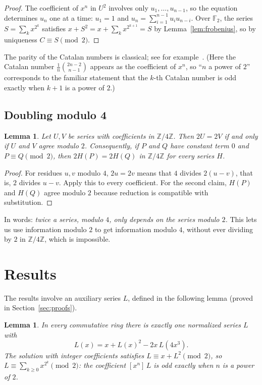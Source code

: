 \documentclass[11pt,a4paper]{article}
\newtheorem{lemma}[theorem]{Lemma}
\theoremstyle{definition}
\theoremstyle{remark}
\newcommand{\Z}{\mathbb{Z}}
\newcommand{\F}{\mathbb{F}}
\newcommand{\coeff}[2]{[x^{#1}]\,#2}
\begin{document}
\begin{proof}
The coefficient of $x^n$ in $U^2$ involves only $u_1,\dots,u_{n-1}$, so the equation determines $u_n$ one at a time:
$u_1=1$ and $u_n=\sum_{i=1}^{n-1}u_iu_{n-i}$. Over $\F_2$, the series $S=\sum_kx^{2^k}$ satisfies
$x+S^2=x+\sum_kx^{2^{k+1}}=S$ by Lemma~\ref{lem:frobenius}, so by uniqueness $C\equiv S\pmod2$.
\end{proof}
The parity of the Catalan numbers is classical; see for example~\cite{deutschsagan}. (Here the Catalan number
$\frac1{n}\binom{2n-2}{n-1}$ appears as the coefficient of $x^n$, so ``$n$ a power of $2$'' corresponds to the familiar
statement that the $k$-th Catalan number is odd exactly when $k+1$ is a power of $2$.)

\subsection{Doubling modulo 4}
\begin{lemma}\label{lem:double}
Let $U,V$ be series with coefficients in $\Z/4\Z$. Then $2U=2V$ if and only if $U$ and $V$ agree modulo $2$.
Consequently, if $P$ and $Q$ have constant term $0$ and $P\equiv Q\pmod 2$, then $2H(P)=2H(Q)$ in $\Z/4\Z$ for every
series $H$.
\end{lemma}

\begin{proof}
For residues $u,v$ modulo $4$, $2u=2v$ means that $4$ divides $2(u-v)$, that is, $2$ divides $u-v$. Apply this to
every coefficient. For the second claim, $H(P)$ and $H(Q)$ agree modulo $2$ because reduction is compatible with
substitution.
\end{proof}
In words: \emph{twice a series, modulo $4$, only depends on the series modulo $2$.} This lets us use information modulo
$2$ to get information modulo $4$, without ever dividing by $2$ in $\Z/4\Z$, which is impossible.


\section{Results}\label{sec:results}

The results involve an auxiliary series $L$, defined in the following lemma (proved in Section~\ref{sec:proofs}).

\begin{lemma}\label{lem:L}
In every commutative ring there is exactly one normalized series $L$ with
\[
L(x)=x+L(x)^2-2x\,L(4x^3).
\]
The solution with integer coefficients satisfies $L\equiv x+L^2\pmod 2$, so $L\equiv\sum_{k\ge0}x^{2^k}\pmod 2$:
the coefficient $\coeff{n}{L}$ is odd exactly when $n$ is a power of $2$.
\end{lemma}
\end{document}
